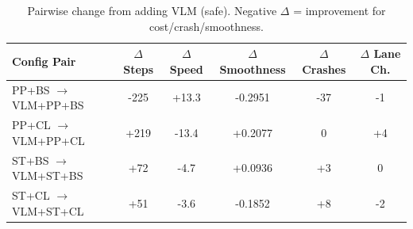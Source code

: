 \begin{table}[htbp]
\centering
\caption{Pairwise change from adding VLM (safe). Negative $\Delta$ = improvement for cost/crash/smoothness.}
\label{tab:pairwise_vlm}
\begin{tabular}{l c c c c c}
\toprule
Config Pair & $\Delta$ Steps & $\Delta$ Speed & $\Delta$ Smoothness & $\Delta$ Crashes & $\Delta$ Lane Ch. \\
\midrule
PP+BS $\to$ VLM+PP+BS & -225 & +13.3 & -0.2951 & -37 & -1 \\
PP+CL $\to$ VLM+PP+CL & +219 & -13.4 & +0.2077 & 0 & +4 \\
ST+BS $\to$ VLM+ST+BS & +72 & -4.7 & +0.0936 & +3 & 0 \\
ST+CL $\to$ VLM+ST+CL & +51 & -3.6 & -0.1852 & +8 & -2 \\
\bottomrule
\end{tabular}
\end{table}